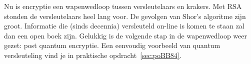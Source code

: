 \documentclass[../../main.tex]{subfiles}
\begin{document}
Nu is encryptie een wapenwedloop tussen versleutelaars en krakers. Met RSA stonden de versleutelaars heel lang voor. De gevolgen van Shor's algoritme zijn groot. Informatie die (sinds decennia) versleuteld on-line is komen te staan zal dan een open boek zijn. Gelukkig is de volgende stap in de wapenwedloop weer gezet: post quantum encryptie. Een eenvoudig voorbeeld van quantum versleuteling vind je in praktische opdracht~\ref{sec:poBB84}.
\end{document}
